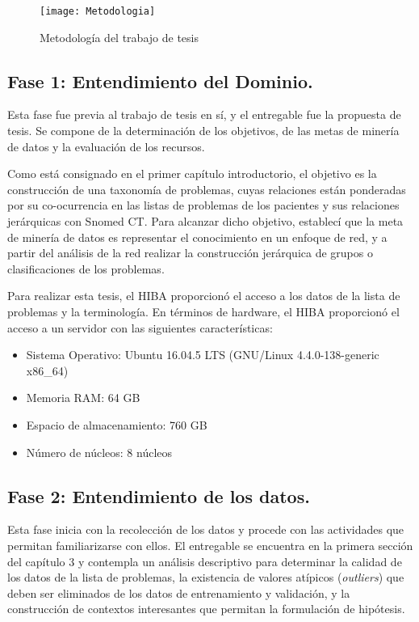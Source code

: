 \begin{figure}[ht]
\caption{Metodología del trabajo de tesis}
\label{fig:Metodologia}
\centering
\texttt{[image: Metodologia]}
\end{figure}

\subsection{Fase 1: Entendimiento del Dominio.} Esta fase fue previa al trabajo de tesis en sí, y el entregable fue la propuesta de tesis. Se compone de la determinación de los objetivos, de las metas de minería de datos y la evaluación de los recursos.

Como está consignado en el primer capítulo introductorio, el objetivo es la construcción de una taxonomía de problemas, cuyas relaciones están ponderadas por su co-ocurrencia en las listas de problemas de los pacientes y sus relaciones jerárquicas con Snomed CT. Para alcanzar dicho objetivo, establecí que la meta de minería de datos es representar el conocimiento en un enfoque de red, y a partir del análisis de la red realizar la construcción jerárquica de grupos o clasificaciones de los problemas.

Para realizar esta tesis, el \acrshort{HIBA} proporcionó el acceso a los datos de la lista de problemas y la terminología. En términos de hardware, el \acrshort{HIBA} proporcionó el acceso a un servidor con las siguientes características:
\begin{itemize}
\item Sistema Operativo: Ubuntu 16.04.5 LTS (GNU/Linux 4.4.0-138-generic x86\_64)
\item Memoria RAM: 64 GB 
\item Espacio de almacenamiento: 760 GB
\item Número de núcleos: 8 núcleos
\end{itemize}

\subsection{Fase 2: Entendimiento de los datos.} Esta fase inicia con la recolección de los datos y procede con las actividades que permitan familiarizarse con ellos. El entregable se encuentra en la primera sección del capítulo 3 y contempla un análisis descriptivo para determinar la calidad de los datos de la lista de problemas, la existencia de valores atípicos (\textit{outliers})  que deben ser eliminados de los datos de entrenamiento y validación, y la construcción de contextos interesantes que permitan la formulación de hipótesis.

